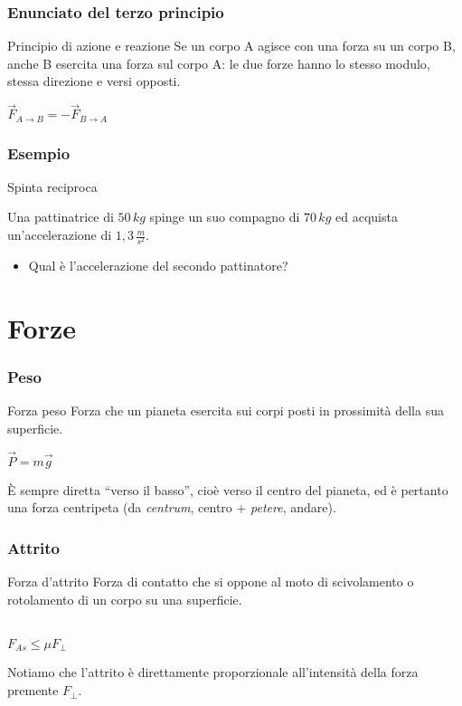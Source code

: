 \documentclass[]{beamer}
\theoremstyle{plain}
\begin{document}
\begin{frame}
  \frametitle{Enunciato del terzo principio}
\begin{block}{Principio di azione e reazione}
Se un corpo A agisce con una forza su un corpo B, anche B esercita una forza sul corpo A: le due forze hanno lo stesso modulo, stessa direzione e versi opposti.\pause
\begin{center}
\colorbox{marroncino!30}{$ \vec{F}_{A \rightarrow B} = - \vec{F}_{B \rightarrow A} $}
\end{center}
\end{block}
\end{frame}


\begin{frame}
\frametitle{Esempio}
\begin{exampleblock}{Spinta reciproca}
{\small Una pattinatrice di $ 50 \, kg $ spinge un suo compagno di $ 70 \, kg $ ed acquista un'accelerazione di $ 1,3 \, \frac{m}{s^2} $.

\begin{itemize}
  \item Qual è l'accelerazione del secondo pattinatore?
\end{itemize}}
\end{exampleblock}
\end{frame}



\section{Forze}

\begin{frame}
  \frametitle{Peso}
\begin{block}{Forza peso}
Forza che un pianeta esercita sui corpi posti in prossimità della sua superficie.\pause
\begin{center}
\colorbox{marroncino!30}{$ \vec{P} = m \vec{g} $}
\end{center}
\end{block}\pause
È sempre diretta ``verso il basso'', cioè verso il centro del pianeta, ed è pertanto una forza \alert{centripeta} (da \emph{centrum}, centro + \emph{petere}, andare).
\end{frame}



\begin{frame}
\frametitle{Attrito}  
\begin{block}{Forza d'attrito}
Forza di contatto che si oppone al moto di scivolamento o rotolamento di un corpo su una superficie.\\~\\\pause
\begin{center}
\colorbox{marroncino!30}{$ F_{As} \leq \mu F_\perp $}
\end{center}
\end{block}\pause
Notiamo che l'attrito è direttamente proporzionale all'intensità della \alert{forza premente} $ F_\perp $.
\end{frame}
\end{document}
